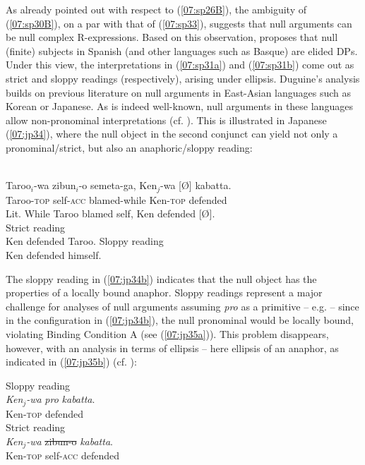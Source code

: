 \documentclass[output=paper,colorlinks,citecolor=brown,draft,draftmode]{langscibook}
\begin{document}
As already pointed out with respect to (\ref{07:sp26B}), the ambiguity of (\ref{07:sp30B}), on a par with that of (\ref{07:sp33}), suggests that null arguments can be null complex R-expressions. Based on this observation, \citet{duguine13, duguine14} proposes that null (finite) subjects in Spanish (and other languages such as Basque) are elided DPs. Under this view, the interpretations in (\ref{07:sp31a}) and (\ref{07:sp31b}) come out as strict and sloppy readings (respectively), arising under ellipsis.
Duguine’s analysis builds on previous literature on null arguments in East-Asian languages such as Korean or Japanese. As is indeed well-known, null arguments in these languages allow non-pronominal interpretations (cf. \citealt{oku98, kim99, saito07, takahashi14}). This is illustrated in Japanese (\ref{07:jp34}), where the null object in the second conjunct can yield not only a pronominal/strict, but also an anaphoric/sloppy reading:

\begin{exe}
\ex
\label{07:jp34}
 \\
\gll Taroo$_i$-wa zibun$_i$-o semeta-ga, Ken$_j$-wa [Ø] kabatta.\\
Taroo-\textsc{top} self-\textsc{acc} blamed-while Ken-\textsc{top} {} defended\\
\glt Lit. While Taroo blamed self, Ken defended [Ø].\\
\ea\label{07:jp34a}\cmark Strict reading\\
Ken defended Taroo.
\ex\label{07:jp34b} \cmark Sloppy reading\\
Ken defended himself.
\z
\end{exe}

The sloppy reading in (\ref{07:jp34b}) indicates that the null object has the properties of a locally bound anaphor. Sloppy readings represent a major challenge for analyses of null arguments assuming \textit{pro} as a primitive -- e.g. \citet{chomsky82, rizzi86} -- since in the configuration in (\ref{07:jp34b}), the null pronominal would be locally bound, violating Binding Condition A (see (\ref{07:jp35a})). This problem disappears, however, with an analysis in terms of ellipsis -- here ellipsis of an anaphor, as indicated in (\ref{07:jp35b}) (cf. \citealt{oku98, kim99, saito07, takahashi14}):

\ea\label{07:jp35}
\ea\label{07:jp35a}\xmark Sloppy reading \\
\gll \textit{Ken$_j$-wa} \textit{pro} \textit{kabatta}.\\
Ken-\textsc{top} {} defended\\
\ex \cmark Strict reading \\
\gll\label{07:jp35b}\textit{Ken$_j$-wa} \st{zibun-o} \textit{kabatta}.\\
Ken-\textsc{top} self-\textsc{acc} defended \\
\z
\z
\end{document}
